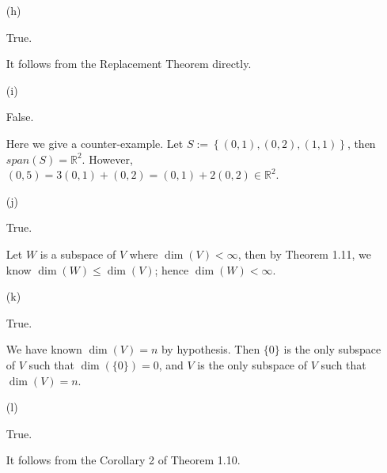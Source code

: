 \begin{Exercise}
\begin{enumerate}[(a)]
\item[(h)]
\begin{answer}
True.
\end{answer}
\begin{solution}
It follows from the Replacement Theorem directly.
\end{solution}

\item[(i)]
\begin{answer}
False.
\end{answer}
\begin{solution}
Here we give a counter-example. Let $S := \left\{(0,1),(0,2),(1,1)\right\}$, then $span(S) = \mathbb{R}^2$. However, $(0,5) = 3(0,1)+(0,2) = (0,1)+2(0,2)\in\mathbb{R}^2$.
\end{solution}

\item[(j)]
\begin{answer}
True.
\end{answer}
\begin{solution}
Let $W$ is a subspace of $V$ where $\dim(V) < \infty$, then by Theorem 1.11, we know $\dim(W)\leq \dim(V)$; hence $\dim(W) < \infty$.
\end{solution}

\item[(k)]
\begin{answer}
True.
\end{answer}
\begin{solution}
We have known $\dim(V) = n$ by hypothesis. Then $\{0\}$ is the only subspace of $V$ such that $\dim(\{0\}) = 0$, and $V$ is the only subspace of $V$ such that $\dim(V) = n$.
\end{solution}

\item[(l)]
\begin{answer}
True.
\end{answer}
\begin{solution}
It follows from the Corollary 2 of Theorem 1.10.
\end{solution}

\end{enumerate}
\end{Exercise}